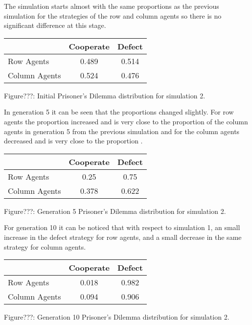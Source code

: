\documentclass{article}
\begin{document}
The simulation starts almost with the same proportions as the previous simulation for the strategies of the row and column agents so there is no significant difference at this stage.
\begin{center}
\begin{tabular}{|l|c|c|}
\hline
& Cooperate & Defect \\ 
\hline
Row Agents & 0.489 & 0.514\\
\hline
Column Agents & 0.524 & 0.476\\
\hline
\end{tabular}
\end{center}
\begin{center}
Figure???: Initial Prisoner’s Dilemma distribution for simulation 2.
\end{center}

In generation 5 it can be seen that the proportions changed slightly. For row agents the proportion increased and is very close to the proportion of the column agents in generation 5 from the previous simulation and for the column agents decreased and is very close to the proportion . 
\begin{center}
\begin{tabular}{|l|c|c|}
\hline
& Cooperate & Defect \\ 
\hline
Row Agents & 0.25 & 0.75\\
\hline
Column Agents & 0.378 & 0.622\\
\hline
\end{tabular}
\end{center}
\begin{center}
Figure???: Generation 5 Prisoner’s Dilemma distribution for simulation 2.
\end{center}

For generation 10 it can be noticed that with respect to simulation 1, an small increase in the defect strategy for row agents, and a small decrease in the same strategy for column agents. 
\begin{center}
\begin{tabular}{|l|c|c|}
\hline
& Cooperate & Defect \\ 
\hline
Row Agents & 0.018 & 0.982\\
\hline
Column Agents & 0.094 & 0.906\\
\hline
\end{tabular}
\end{center}
\begin{center}
Figure???: Generation 10 Prisoner’s Dilemma distribution for simulation 2.
\end{center}
\end{document}
